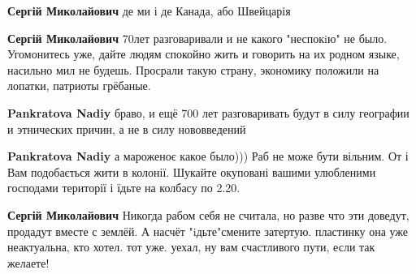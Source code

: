 \begin{itemize}
\begin{itemize}
 
\textbf{Сергій Миколайович} де ми і де Канада, або Швейцарія 🤣

 
\textbf{Сергій Миколайович} 70лет разговаривали и не какого "неспокiю" не было. Угомонитесь уже, дайте людям спокойно жить и говорить на их родном языке, насильно мил не будешь. Просрали такую страну, экономику положили на лопатки, патриоты грёбаные.

 
\textbf{Pankratova Nadiy} браво, и ещё 700 лет разговаривать будут в силу географии и этнических причин, а не в силу нововведений

 
\textbf{Pankratova Nadiy} а мароженоє какое было)))
Раб не може бути вільним. От і Вам подобається жити в колонії. Шукайте окуповані вашими улюбленими господами території і їдьте на колбасу по 2.20.

 
\textbf{Сергій Миколайович} Никогда рабом себя не считала, но разве что эти доведут, продадут вместе с землёй. А насчёт "iдьте"смените затертую. пластинку она уже неактуальна, кто хотел. тот уже. уехал, ну вам счастливого пути, если так желаете!


\end{itemize}
\end{itemize}
